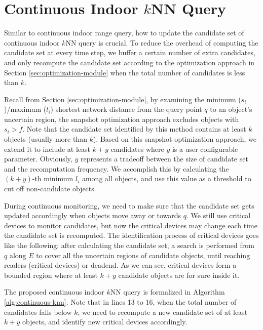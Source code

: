\documentclass[12pt]{report}
\begin{document}
\section{Continuous Indoor \(k\)NN Query}
\label{sec:orgae0624e}

Similar to continuous indoor range query, how to update the
candidate set of continuous indoor \(k\)NN query is crucial.  To
reduce the overhead of computing the candidate set at every time
step, we buffer a certain number of extra candidates, and only
recompute the candidate set according to the optimization approach
in Section \ref{sec:optimization-module} when the total number of
candidates is less than \(k\).

Recall from Section \ref{sec:optimization-module}, by examining the
minimum (\(s_i\))/maximum (\(l_i\)) shortest network distance from
the query point \(q\) to an object's uncertain region, the
snapshot optimization approach excludes objects with \(s_i>f\).
Note that the candidate set identified by this method contains at
least \(k\) objects (usually more than \(k\)).  Based on this
snapshot optimization approach, we extend it to include at least
\(k+y\) candidates where \(y\) is a user configurable parameter.
Obviously, \(y\) represents a tradeoff between the size of
candidate set and the recomputation frequency.  We accomplish this
by calculating the \((k+y)\)-th minimum \(l_i\) among all objects,
and use this value as a threshold to cut off non-candidate
objects.

During continuous monitoring, we need to make sure that the
candidate set gets updated accordingly when objects move away or
towards \(q\).  We still use critical devices to monitor
candidates, but now the critical devices may change each time the
candidate set is recomputed.  The identification process of
critical devices goes like the following: after calculating the
candidate set, a search is performed from \(q\) along \(E\) to
cover all the uncertain regions of candidate objects, until
reaching readers (critical devices) or deadend.  As we can see,
critical devices form a bounded region where at least \(k+y\)
candidate objects are for sure inside it.

The proposed continuous indoor \(k\)NN query is formalized in
Algorithm \ref{alg:continuous-knn}.  Note that in lines 13 to 16,
when the total number of candidates falls below \(k\), we need to
recompute a new candidate set of at least \(k+y\) objects, and
identify new critical devices accordingly.
\end{document}
